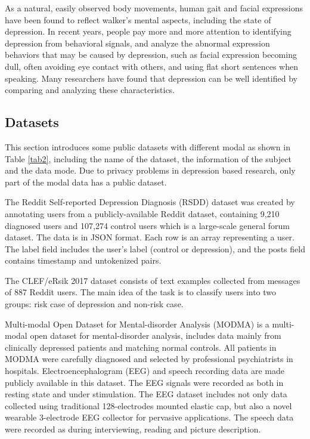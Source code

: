 As a natural, easily observed body movements, human gait and facial expressions have been found to reflect walker’s mental aspects, including the state of depression.
In recent years, people pay more and more attention to identifying depression from behavioral signals, and analyze the abnormal expression behaviors that may be caused by depression, such as facial expression becoming dull, often avoiding eye contact with others, and using flat short sentences when speaking. Many researchers have found that depression can be well identified by comparing and analyzing these characteristics.


\subsection{Datasets}
This section introduces some public datasets with different modal as shown in Table \ref{tab2}, including the name of the dataset, the information of the subject and the data mode.
Due to privacy problems in depression based research, only part of the modal data has a public dataset.

The Reddit Self-reported Depression Diagnosis (RSDD) dataset was created by annotating users from a publicly-available Reddit dataset, containing 9,210 diagnosed users and 107,274 control users which is a large-scale general forum dataset.
The data is in JSON format. Each row is an array representing a user. The label field includes the user's label (control or depression), and the posts field contains timestamp and untokenized pairs.

The CLEF/eRsik 2017 dataset consists of text examples collected from messages of 887 Reddit users. The main idea of the task is to classify users into two groups: risk case of depression and non-risk case.

Multi-modal Open Dataset for Mental-disorder Analysis (MODMA) is a multi-modal open dataset for mental-disorder analysis, includes data mainly from clinically depressed patients and matching normal controls. All patients in MODMA were carefully diagnosed and selected by professional psychiatrists in hospitals. Electroencephalogram (EEG) and speech recording data are made publicly available in this dataset. The EEG signals were recorded as both in resting state and under stimulation. The EEG dataset includes not only data collected using traditional 128-electrodes mounted elastic cap, but also a novel wearable 3-electrode EEG collector for pervasive applications. The speech data were recorded as during interviewing, reading and picture description.

